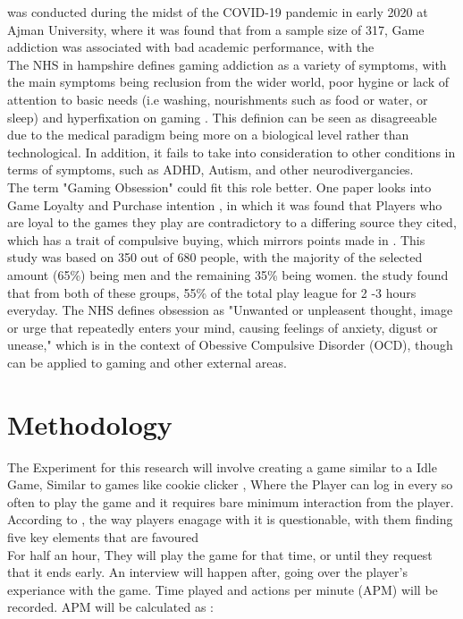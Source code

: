 \documentclass[conference]{IEEEtran}
\begin{document}
\cite{Naaj2021} was conducted during the midst of the COVID-19 pandemic in early 2020 at Ajman University, where it was found that from a sample size of 317, Game addiction was associated with bad academic performance, with the \\

The NHS in hampshire defines gaming addiction as a variety of symptoms, with the main symptoms being reclusion from the wider world, poor hygine or lack of attention to basic needs (i.e washing, nourishments such as food or water, or sleep) and hyperfixation on gaming \cite{NHSHamp24}. This definion can be seen as disagreeable due to the medical paradigm being more on a biological level rather than technological. In addition, it fails to take into consideration to other conditions in terms of symptoms, such as ADHD, Autism, and other neurodivergancies.\\

The term "Gaming Obsession" could fit this role better. One paper looks into Game Loyalty and Purchase intention \cite{Ramli2022}, in which it was found that Players who are loyal to the games they play are contradictory to a differing source they cited\cite{Widodo2020}, which has a trait of compulsive buying, which mirrors points made in \cite {yasir2021}.  This study was based on 350 out of 680 people, with the majority of the selected amount (65\%) being men and the remaining 35\% being women. the study found that from both of these groups, 55\% of the total play league for 2 -3 hours everyday. The NHS  \cite{NHS2021} defines obsession as "Unwanted or unpleasent thought, image or urge that repeatedly enters your mind, causing feelings of anxiety, digust or unease," which is in the context of Obessive Compulsive Disorder (OCD), though can be applied to gaming and other external areas.\\

\section{Methodology}
The Experiment for this research will involve creating a game similar to a Idle Game, Similar to games like cookie clicker \cite{CookieSteam21}, Where the Player can log in every so often to play the game and it requires bare minimum interaction from the player. According to \cite{Hwang2024}, the way players enagage with it is questionable, with them finding five key elements that are favoured\\
\newline
For half an hour, They will play the game for that time, or until they request that it ends early. An interview will happen after, going over the player's experiance with the game. Time played and actions per minute (APM) will be recorded. APM will be calculated as :\\
\end{document}
